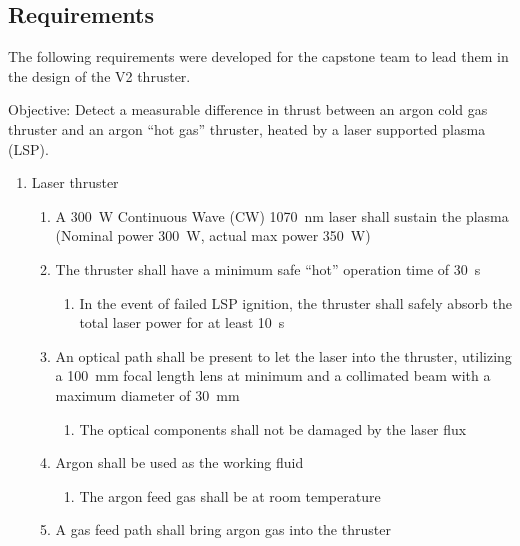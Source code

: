         \subsection{Requirements}

            The following requirements were developed for the capstone team to lead them in the design of the V2 thruster.

            Objective: Detect a measurable difference in thrust between an argon cold gas thruster and an argon “hot gas” thruster, heated by a laser supported plasma (LSP).

            \begin{enumerate}
                \item Laser thruster
                \begin{enumerate}
                    \item A \qty{300}{W} Continuous Wave (CW) \qty{1070}{nm} laser shall sustain the plasma (Nominal power \qty{300}{W}, actual max power \qty{350}{W})
                    \item The thruster shall have a minimum safe “hot” operation time of \qty{30}{s}
                    \begin{enumerate}
                        \item In the event of failed LSP ignition, the thruster shall safely absorb the total laser power for at least \qty{10}{s}
                    \end{enumerate}
                    \item An optical path shall be present to let the laser into the thruster, utilizing a \qty{100}{mm} focal length lens at minimum and a collimated beam with a maximum diameter of \qty{30}{mm}
                    \begin{enumerate}
                        \item The optical components shall not be damaged by the laser flux
                    \end{enumerate}
                    \item Argon shall be used as the working fluid
                    \begin{enumerate}
                        \item The argon feed gas shall be at room temperature
                    \end{enumerate}
                    \item A gas feed path shall bring argon gas into the thruster

\end{enumerate}
\end{enumerate}
